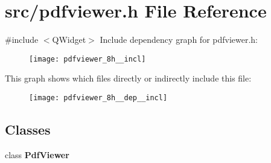 \section{src/pdfviewer.h File Reference}
\label{pdfviewer_8h}
{\ttfamily \#include $<$Q\+Widget$>$}\newline
Include dependency graph for pdfviewer.\+h\+:\nopagebreak
\begin{figure}[H]
\begin{center}
\leavevmode
\texttt{[image: pdfviewer\_8h\_\_incl]}
\end{center}
\end{figure}
This graph shows which files directly or indirectly include this file\+:\nopagebreak
\begin{figure}[H]
\begin{center}
\leavevmode
\texttt{[image: pdfviewer\_8h\_\_dep\_\_incl]}
\end{center}
\end{figure}
\subsection*{Classes}
\begin{DoxyCompactItemize}
\item 
class \textbf{ Pdf\+Viewer}
\end{DoxyCompactItemize}
